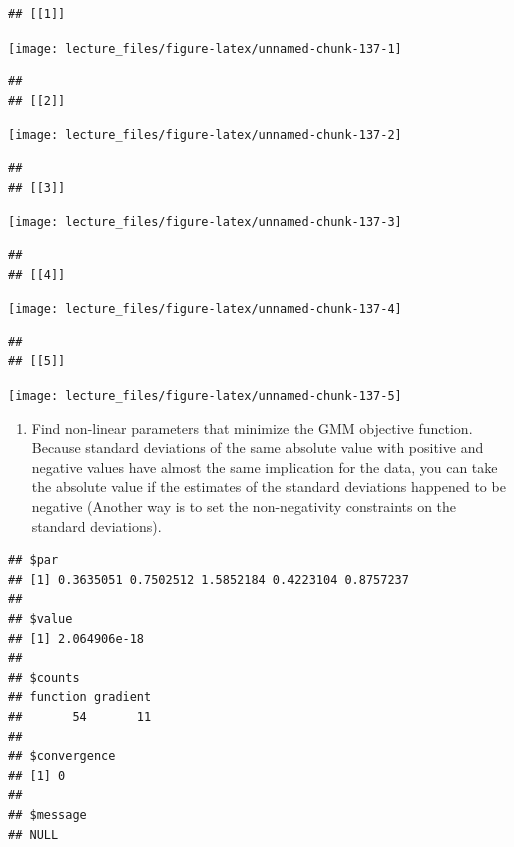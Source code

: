 \documentclass[]{book}
\providecommand{\tightlist}{%
  \setlength{\itemsep}{0pt}\setlength{\parskip}{0pt}}
\begin{document}
\begin{verbatim}
## [[1]]
\end{verbatim}

\begin{center}\texttt{[image: lecture\_files/figure-latex/unnamed-chunk-137-1]} \end{center}

\begin{verbatim}
## 
## [[2]]
\end{verbatim}

\begin{center}\texttt{[image: lecture\_files/figure-latex/unnamed-chunk-137-2]} \end{center}

\begin{verbatim}
## 
## [[3]]
\end{verbatim}

\begin{center}\texttt{[image: lecture\_files/figure-latex/unnamed-chunk-137-3]} \end{center}

\begin{verbatim}
## 
## [[4]]
\end{verbatim}

\begin{center}\texttt{[image: lecture\_files/figure-latex/unnamed-chunk-137-4]} \end{center}

\begin{verbatim}
## 
## [[5]]
\end{verbatim}

\begin{center}\texttt{[image: lecture\_files/figure-latex/unnamed-chunk-137-5]} \end{center}

\begin{enumerate}
\def\labelenumi{\arabic{enumi}.}
\setcounter{enumi}{12}
\tightlist
\item
  Find non-linear parameters that minimize the GMM objective function.
  Because standard deviations of the same absolute value with positive
  and negative values have almost the same implication for the data, you
  can take the absolute value if the estimates of the standard
  deviations happened to be negative (Another way is to set the
  non-negativity constraints on the standard deviations).
\end{enumerate}

\begin{verbatim}
## $par
## [1] 0.3635051 0.7502512 1.5852184 0.4223104 0.8757237
## 
## $value
## [1] 2.064906e-18
## 
## $counts
## function gradient 
##       54       11 
## 
## $convergence
## [1] 0
## 
## $message
## NULL
\end{verbatim}
\end{document}
